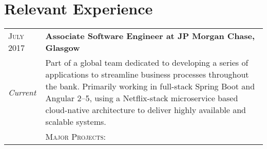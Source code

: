 \section{Relevant Experience}\label{sec:relevant-experience}

\begin{tabular}{p{60pt}|p{11cm}}
    \hspace*{\fill}\textsc{July 2017} & \textbf{Associate Software Engineer at JP Morgan Chase, Glasgow} \\

    \hspace*{\fill}\emph{Current}& \small{
    Part of a global team dedicated to developing a series of applications to streamline business processes throughout the bank.
    Primarily working in full-stack Spring Boot and Angular 2--5, using a Netflix-stack microservice based cloud-native architecture to deliver highly available and scalable systems.
    } \\

    \ & \vspace{1pt}\textsc{Major Projects}: \\


\end{tabular}
